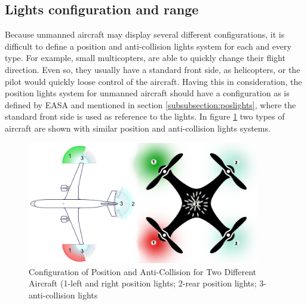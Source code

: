 \subsection{Lights configuration and range}
\label{subsection:lightsrange}

Because unmanned aircraft may display several different configurations, it is difficult to define a position and anti-collision lights system for each and every type. For example, small multicopters, are able to quickly change their flight direction. Even so, they usually have a standard front side, as helicopters, or the pilot would quickly loose control of the aircraft. Having this in consideration, the position lights system for unmanned aircraft should have a configuration as is defined by EASA \citep{Easa2012} and mentioned in section \ref{subsubsection:poslights}, where the standard front side is used as reference to the lights. In figure \ref{fig:esquemalights2} two types of aircraft are shown with similar position and anti-collision lights systems.

\begin{figure}[!htb]
  \centering
  \includegraphics[width=0.90\textwidth]{Figures/esquemalights2.png}
  \caption[Configuration of Position and Anti-Collision for Two Different Aircraft]{Configuration of Position and Anti-Collision for Two Different Aircraft (1-left and right position lights; 2-rear position lights; 3-anti-collision lights}
  \label{fig:esquemalights2}
\end{figure}

